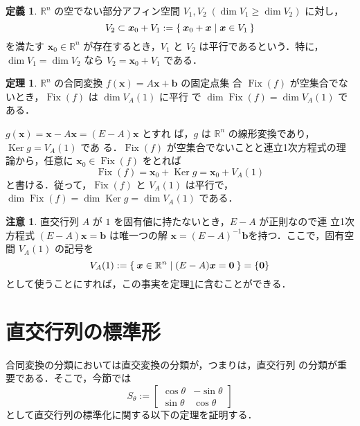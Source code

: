 \documentclass[11pt, uplatex, dvipdfmx, titlepage]{jsarticle}
\makeatletter
\DeclareMathOperator{\Fix}{Fix}
\DeclareMathOperator{\Ker}{Ker}
\renewenvironment{proof}[1][\proofname]{\par
  \pushQED{\qed}%
  \normalfont \topsep6\p@\@plus6\p@\relax
  \trivlist
  \item[\hskip\labelsep
         \bfseries
    {#1}]\ignorespaces
}{%
  \popQED\endtrivlist\@endpefalse
}
\theoremstyle{definition}
\newtheorem{theorem}{定理}[section]
\newtheorem*{definition}{定義}
\renewcommand{\proofname}{\textbf{証明}}
\newtheorem*{remark}{注意}
\makeatother
\begin{document}
\begin{definition}
  $\mathbb{R}^n$ の空でない部分アフィン空間 $V_1, V_2 \; (\dim V_1 \geq \dim V_2)$ に対し，
  \[
    V_2 \subset \bm{x}_0 + V_1 := \Set{ \bm{x}_0 + \bm{x} | \bm{x} \in V_1}
  \]
  を満たす $\bm{x}_0 \in \mathbb{R}^n$ が存在するとき，$V_1$ と $V_2$
  は平行であるという．特に，$\dim V_1 = \dim V_2$ なら $V_2 = \bm{x}_0
  +V_1$ である．
\end{definition}


\begin{theorem}\label{thm:dimfix}
  $\mathbb{R}^n$ の合同変換 $f(\bm{x}) = A\bm{x} + \bm{b}$ の固定点集
  合 $\Fix(f)$ が空集合でないとき，$\Fix(f)$ は $\dim V_A(1)$ に平行
  で $\dim \Fix(f) = \dim V_A(1)$ である．
\end{theorem}

\begin{proof}
  $g(\bm{x}) = \bm{x} - A\bm{x} = (E-A)\bm{x}$ とすれ
  ば，$g$ は $\mathbb{R}^n$ の線形変換であり，$\Ker g = V_A(1)$ であ
  る．$\Fix(f)$ が空集合でないことと連立1次方程式の理論から，任意に $\bm{x}_0 \in \Fix(f)$ をとれば
  \[
    \Fix(f) = \bm{x}_0 + \Ker g = \bm{x}_0 + V_A(1)
  \]
  と書ける．従って，$\Fix(f)$ と $V_A(1)$
  は平行で，$\dim \Fix(f) = \dim \Ker g = \dim V_A(1)$ である．
\end{proof}

\begin{remark}
  直交行列 $A$ が $1$ を固有値に持たないとき，$E-A$ が正則なので連
  立1次方程式 $(E-A)\bm{x} = \bm{b}$ は唯一つの解
  $\bm{x} = (E-A)^{-1}\bm{b}$を持つ．ここで，固有空間 $V_A(1)$ の記号を
\[
  V_A(1) := \Set{\bm{x} \in \mathbb{R}^n \mid (E-A)\bm{x} =\bm{0} }= \{\bm{0}\}
\]
として使うことにすれば，この事実を定理\ref{thm:dimfix}に含むことができる．
\end{remark}



\section{直交行列の標準形}\label{sec:orth}

合同変換の分類においては直交変換の分類が，つまりは，直交行列
の分類が重要である．そこで，今節では
\[
  S_{\theta}:=\left[
    \begin{array}{rr}
      \cos \theta & -\sin \theta\\
      \sin \theta & \cos \theta
    \end{array}
  \right]
\]
として直交行列の標準化に関する以下の定理を証明する．
\end{document}
